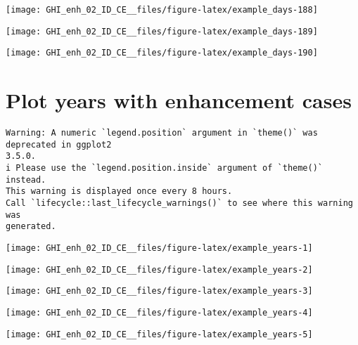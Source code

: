 \documentclass[
  10pt,
  a4paper,oneside]{article}
\begin{document}
\begin{center}\texttt{[image: GHI\_enh\_02\_ID\_CE\_\_files/figure-latex/example\_days-188]} \end{center}

\begin{center}\texttt{[image: GHI\_enh\_02\_ID\_CE\_\_files/figure-latex/example\_days-189]} \end{center}

\begin{center}\texttt{[image: GHI\_enh\_02\_ID\_CE\_\_files/figure-latex/example\_days-190]} \end{center}

\newpage
\FloatBarrier

\hypertarget{plot-years-with-enhancement-cases}{%
\section{Plot years with enhancement cases}\label{plot-years-with-enhancement-cases}}

\begin{verbatim}
Warning: A numeric `legend.position` argument in `theme()` was deprecated in ggplot2
3.5.0.
i Please use the `legend.position.inside` argument of `theme()` instead.
This warning is displayed once every 8 hours.
Call `lifecycle::last_lifecycle_warnings()` to see where this warning was
generated.
\end{verbatim}

\begin{center}\texttt{[image: GHI\_enh\_02\_ID\_CE\_\_files/figure-latex/example\_years-1]} \end{center}

\begin{center}\texttt{[image: GHI\_enh\_02\_ID\_CE\_\_files/figure-latex/example\_years-2]} \end{center}

\begin{center}\texttt{[image: GHI\_enh\_02\_ID\_CE\_\_files/figure-latex/example\_years-3]} \end{center}

\begin{center}\texttt{[image: GHI\_enh\_02\_ID\_CE\_\_files/figure-latex/example\_years-4]} \end{center}

\begin{center}\texttt{[image: GHI\_enh\_02\_ID\_CE\_\_files/figure-latex/example\_years-5]} \end{center}
\end{document}
